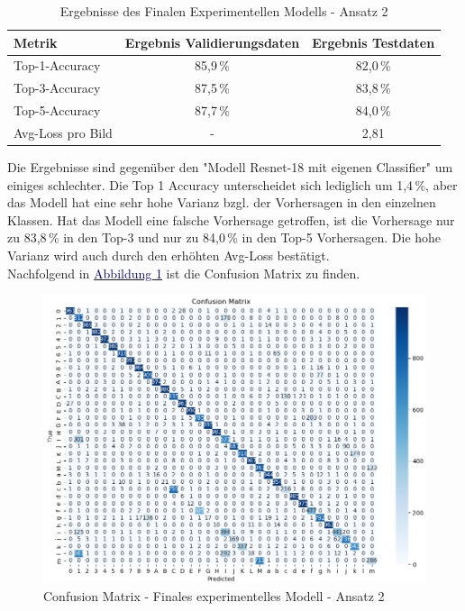 \documentclass[12pt,oneside]{article}
\begin{document}
  
  \begin{table}[h!]
  	\centering
  	\begin{tabular}{|l|c|c|}
  		\hline
  		\rowcolor{lightgray} \textbf{Metrik} & \textbf{Ergebnis Validierungsdaten} & \textbf{Ergebnis Testdaten} \\ \hline
  		Top-1-Accuracy & 85,9\,\% & 82,0\,\% \\ \hline
  		Top-3-Accuracy & 87,5\,\% & 83,8\,\% \\ \hline
  		Top-5-Accuracy & 87,7\,\% & 84,0\,\% \\ \hline
  		Avg-Loss pro Bild & - & 2,81 \\ \hline
  	\end{tabular}
  	\caption{Ergebnisse des Finalen Experimentellen Modells - Ansatz 2}
  \end{table}
  	Die Ergebnisse sind gegenüber den "Modell Resnet-18 mit eigenen Classifier" um einiges schlechter. Die Top 1 Accuracy unterscheidet sich lediglich um 1,4\,\%, aber das Modell hat eine sehr hohe Varianz bzgl. der Vorhersagen in den einzelnen Klassen. Hat das Modell eine falsche Vorhersage getroffen, ist die Vorhersage nur zu 83,8\,\% in den Top-3 und nur zu 84,0\,\% in den Top-5 Vorhersagen. Die hohe Varianz wird auch durch den erhöhten Avg-Loss bestätigt. \\
  	Nachfolgend in \hyperref[fig:ConfusionMatrixTrainTestFinalcc2]{\textcolor{darkblue}{Abbildung \ref*{fig:ConfusionMatrixTrainTestFinalcc2}}} ist die Confusion Matrix zu finden.
		   \begin{figure}[h!]
				\centering
				\includegraphics[width=0.9\linewidth]{Bilder/ConfusionMatrix/TrainTestFinal_cc2.png}
				\caption[Confusion Matrix des finalen experimentellen Modells - Ansatz 2]{Confusion Matrix - Finales experimentelles Modell - Ansatz 2}
				\label{fig:ConfusionMatrixTrainTestFinalcc2}
			\end{figure}
			
\end{document}
